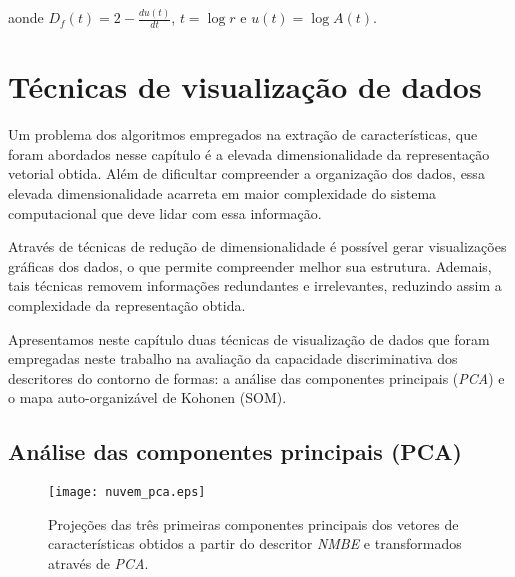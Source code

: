 \noindent aonde  $D_f(t) = 2 - \frac{du(t)}{dt}$, $t = \log{r}$ e $u(t) = \log{A(t)}$.

\section{Técnicas de visualização de dados}

Um problema dos algoritmos empregados na extração de características, que foram abordados nesse capítulo é a elevada dimensionalidade da representação vetorial obtida. Além de dificultar compreender a organização dos dados, essa elevada dimensionalidade acarreta em maior complexidade do sistema computacional que deve lidar com essa informação. 

Através de técnicas de redução de dimensionalidade é possível gerar visualizações gráficas dos dados, o que permite compreender melhor sua estrutura. Ademais, tais técnicas removem informações redundantes e irrelevantes, reduzindo assim a complexidade da representação obtida.

Apresentamos neste capítulo duas técnicas de visualização de dados que foram empregadas neste trabalho na avaliação da capacidade discriminativa dos descritores do contorno de formas: a análise das componentes principais (\emph{PCA}) e o mapa auto-organizável de Kohonen (SOM).



\subsection{Análise das componentes principais (PCA)}

\begin{figure}[h!]
  \caption{\label{fig:nuvem_pca} Projeções das três primeiras componentes principais dos vetores de características obtidos  a partir do descritor \emph{NMBE} e transformados através de \emph{PCA}.}
  \centering
  \texttt{[image: nuvem\_pca.eps]}
\end{figure}

